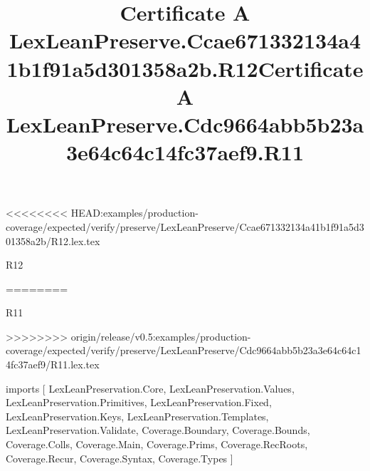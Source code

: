 <<<<<<<< HEAD:examples/production-coverage/expected/verify/preserve/LexLeanPreserve/Ccae671332134a41b1f91a5d301358a2b/R12.lex.tex
\begin{lexlean}{R12}
\title{Certificate A LexLeanPreserve.Ccae671332134a41b1f91a5d301358a2b.R12}
========
\begin{lexlean}{R11}
\title{Certificate A LexLeanPreserve.Cdc9664abb5b23a3e64c64c14fc37aef9.R11}
>>>>>>>> origin/release/v0.5:examples/production-coverage/expected/verify/preserve/LexLeanPreserve/Cdc9664abb5b23a3e64c64c14fc37aef9/R11.lex.tex
\begin{coremodule}
imports [
  LexLeanPreservation.Core,
  LexLeanPreservation.Values,
  LexLeanPreservation.Primitives,
  LexLeanPreservation.Fixed,
  LexLeanPreservation.Keys,
  LexLeanPreservation.Templates,
  LexLeanPreservation.Validate,
  Coverage.Boundary,
  Coverage.Bounds,
  Coverage.Colls,
  Coverage.Main,
  Coverage.Prims,
  Coverage.RecRoots,
  Coverage.Recur,
  Coverage.Syntax,
  Coverage.Types
]


\end{coremodule}
\end{lexlean}
\end{lexlean}
